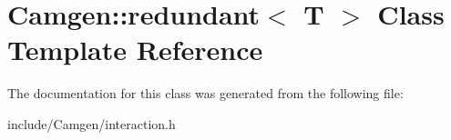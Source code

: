 \hypertarget{a00462}{\section{Camgen\-:\-:redundant$<$ T $>$ Class Template Reference}
\label{a00462}
}


The documentation for this class was generated from the following file\-:\begin{DoxyCompactItemize}
\item 
include/\-Camgen/interaction.\-h\end{DoxyCompactItemize}
